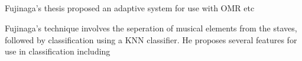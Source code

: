 \subsection{\cite{fujinaga1996adaptive}}

Fujinaga's thesis proposed an adaptive system for use with OMR etc

Fujinaga's technique involves the seperation of musical elements from the staves, followed by
classification using a \acrfull{KNN} classifier. He proposes several features for use in classification including 


